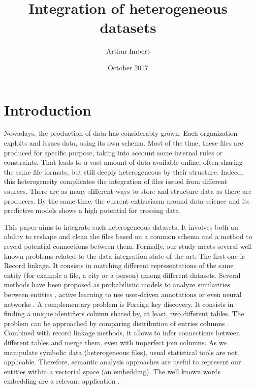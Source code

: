 \documentclass[a4paper]{article}
\author{Arthur Imbert}
\title{Integration of heterogeneous datasets}
\date{October 2017}
\begin{document}
	
	
	\renewcommand{\contentsname}{Table of contents} 
	\setcounter{tocdepth}{4}
	\tableofcontents
	\listoffigures
	
	\newpage
	
	\section{Introduction}
	
	Nowadays, the production of data has considerably grown. Each organization exploits and issues data, using its own schema. Most of the time, these files are produced for specific purpose, taking into account some internal rules or constraints. That leads to a vast amount of data available online, often sharing the same file formats, but still deeply heterogeneous by their structure. Indeed, this heterogeneity complicates the integration of files issued from different sources. There are as many different ways to store and structure data as there are producers. By the same time, the current enthusiasm around data science and its predictive models shows a high potential for crossing data. 
		
	This paper aims to integrate such heterogeneous datasets. It involves both an ability to reshape and clean the files based on a common schema and a method to reveal potential connections between them. Formally, our study meets several well known problems related to the data-integration state of the art. The first one is Record linkage. It consists in matching different representations of the same entity (for example a file, a city or a person) among different datasets. Several methods have been proposed as probabilistic models to analyze similarities between entities \cite{ref9}, active learning to use user-driven annotations \cite{ref10} or even neural networks \cite{ref11}. A complementary problem is Foreign key discovery. It consists in finding a unique identifiers column shared by, at least, two different tables. The problem can be approached by comparing distribution of entries columns \cite{ref12}. Combined with record linkage methods, it allows to infer connections between different tables and merge them, even with imperfect join columns. As we manipulate symbolic data (heterogeneous files), usual statistical tools are not applicable. Therefore, semantic analysis approaches are useful to represent our entities within a vectorial space (an embedding). The well known words embedding are a relevant application \cite{ref7}.
\end{document}

